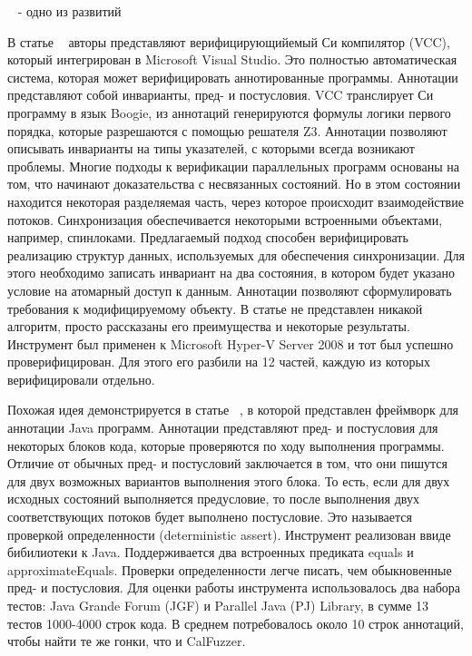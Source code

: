 ~\cite{Abdulla:2014:POPL, Abdulla:2014} - одно из развитий

В статье ~\cite{VCC:2009} авторы представляют верифицирующийемый Си компилятор (VCC), который интегрирован в Microsoft Visual Studio. Это полностью автоматическая система, которая может верифицировать аннотированные программы. Аннотации представляют собой инварианты, пред- и постусловия. VCC транслирует Си программу в язык Boogie, из аннотаций генерируются формулы логики первого порядка, которые разрешаются с помощью решателя Z3. Аннотации позволяют описывать инварианты на типы указателей, с которыми всегда возникают проблемы. 
Многие подходы к верификации параллельных программ основаны на том, что начинают доказательства с несвязанных состояний. Но в этом состоянии находится некоторая разделяемая часть, через которое происходит взаимодействие потоков. Синхронизация обеспечивается некоторыми встроенными объектами, например, спинлоками. Предлагаемый подход способен верифицировать реализацию структур данных, используемых для обеспечения синхронизации. Для этого необходимо записать инвариант на два состояния, в котором будет указано условие на атомарный доступ к данным. Аннотации позволяют сформулировать требования к модифицируемому объекту. 
В статье не представлен никакой алгоритм, просто рассказаны его преимущества и некоторые результаты. Инструмент был применен к Microsoft Hyper-V Server 2008 и тот был успешно проверифицирован. Для этого его разбили на 12 частей, каждую из которых верифицировали отдельно.

Похожая идея демонстрируется в статье ~\cite{Burnim:2009}, в которой представлен фреймворк для аннотации Java программ. Аннотации представляют пред- и постусловия для некоторых блоков кода, которые проверяются по ходу выполнения программы. Отличие от обычных пред- и постусловий заключается в том, что они пишутся для двух возможных вариантов выполнения этого блока. То есть, если для двух исходных состояний выполняется предусловие, то после выполнения двух соответствующих потоков будет выполнено постусловие. Это называется проверкой определенности (deterministic assert). Инструмент реализован ввиде бибилиотеки к Java. Поддерживается два встроенных предиката equals и approximateEquals. 
Проверки определенности легче писать, чем обыкновенные пред- и постусловия. 
Для оценки работы инструмента использовалось два набора тестов: Java Grande Forum (JGF) и Parallel Java (PJ) Library, в сумме 13 тестов 1000-4000 строк кода. В среднем потребовалось около 10 строк аннотаций, чтобы найти те же гонки, что и CalFuzzer. 

